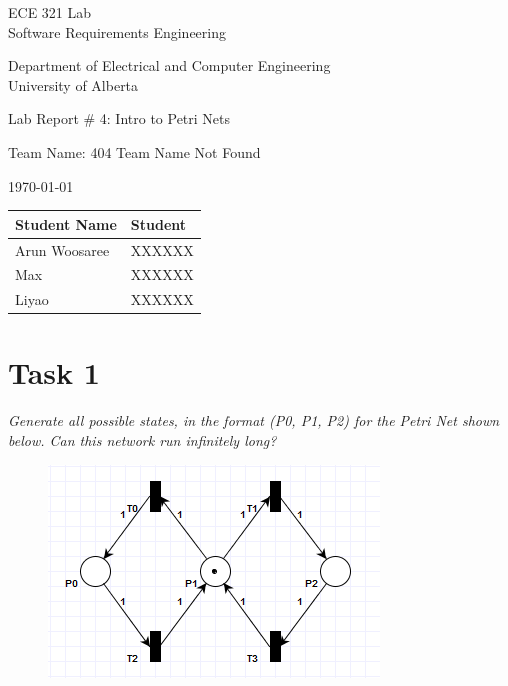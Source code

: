 \documentclass[letterpaper]{article}
\begin{document}
\begin{titlepage}
 \begin{center}

  \LARGE
  ECE 321 Lab\\ Software Requirements Engineering
  
  Department of Electrical and Computer Engineering\\
  
  University of Alberta
  
  \vspace{2cm}
  
  Lab Report \# 4: Intro to Petri Nets
  
  \vspace{2cm}
  
  Team Name: 404 Team Name Not Found
  
  \vspace{2cm}
  
  \today
  
  \vspace{2cm}
  \Large
  
  \begin{tabular}{ | m{5cm} | m{5cm} | }
   \hline
   Student Name  & Student \\
   \hline
   Arun Woosaree & XXXXXX  \\
   \hline
   Max           & XXXXXX  \\
   \hline
   Liyao         & XXXXXX  \\
   \hline
  \end{tabular}
  
  
  
 \end{center}
\end{titlepage}


\section{Task 1}

\textit{Generate all possible states, in the format (P0, P1, P2) for the Petri Net shown below. Can this network run infinitely long?}

\begin{figure}[H]
 \centering
 \includegraphics[width=\textwidth]{image1.png}
\end{figure}
\end{document}

